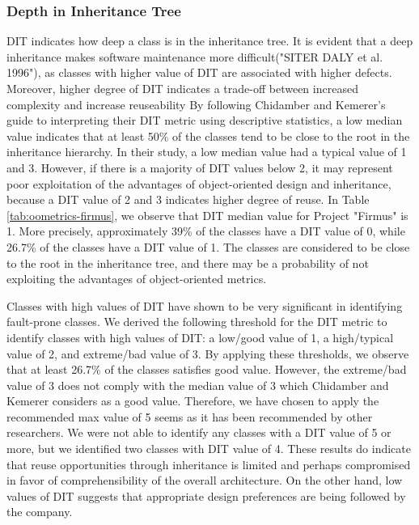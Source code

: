 \subsubsection{Depth in Inheritance Tree}
DIT indicates how deep a class is in the inheritance tree. It is evident that a deep inheritance makes software maintenance more difficult("SITER DALY et al. 1996"), as classes with higher value of DIT are associated with higher defects\cite{subramanyam2003empirical}. Moreover, higher degree of DIT indicates a trade-off between increased complexity and increase reuseability By following Chidamber and Kemerer's\cite{chidamber1994metrics} guide to interpreting their DIT metric using descriptive statistics, a low median value indicates that at least 50\% of the classes tend to be close to the root in the inheritance hierarchy. In their study, a low median value had a typical value of 1 and 3. However, if there is a majority of DIT values below 2, it may represent poor exploitation of the advantages of object-oriented design and inheritance, because a DIT value of 2 and 3 indicates higher degree of reuse. In Table \ref{tab:oometrics-firmus}, we observe that DIT median value for Project "Firmus" is 1. More precisely, approximately 39\% of the classes have a DIT value of 0, while 26.7\% of the classes have a DIT value of 1. The classes are considered to be close to the root in the inheritance tree, and there may be a probability of not exploiting the advantages of object-oriented metrics.

Classes with high values of DIT have shown to be very significant in identifying fault-prone classes\cite{basili1996validation}. We derived the following threshold for the DIT metric to identify classes with high values of DIT: a low/good value of 1, a high/typical value of 2, and extreme/bad value of 3. By applying these thresholds, we observe that at least 26.7\% of the classes satisfies good value. However, the extreme/bad value of 3 does not comply with the median value of 3 which Chidamber and Kemerer\cite{chidamber1994metrics} considers as a good value. Therefore, we have chosen to apply the recommended max value of 5 seems as it has been recommended by other researchers. We were not able to identify any classes with a DIT value of 5 or more, but we identified two classes with DIT value of 4. These results do indicate that reuse opportunities through inheritance is limited and perhaps compromised in favor of comprehensibility of the overall architecture. On the other hand, low values of DIT suggests that appropriate design preferences are being followed by the company\cite{subramanyam2003empirical}.

